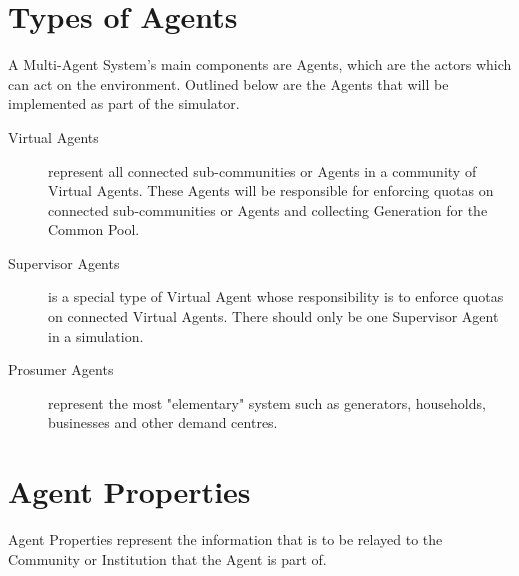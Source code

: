 \section*{Types of Agents}
A Multi-Agent System's main components are Agents, which are the actors which can act on the environment. Outlined below are the Agents that will be implemented as part of the simulator.
\begin{description}

\item[Virtual Agents]
represent all connected sub-communities or Agents in a community of Virtual Agents. These Agents will be responsible for enforcing quotas on connected sub-communities or Agents and collecting Generation for the Common Pool.

\item[Supervisor Agents] 
is a special type of Virtual Agent whose responsibility is to enforce quotas on connected Virtual Agents. There should only be one Supervisor Agent in a simulation.

\item[Prosumer Agents]
represent the most "elementary" system such as generators, households, businesses and other demand centres.
\end{description}

\section*{Agent Properties}
Agent Properties represent the information that is to be relayed to the Community or Institution that the Agent is part of.

